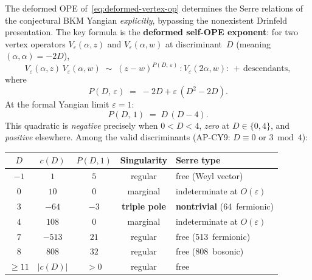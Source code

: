The deformed OPE of~\eqref{eq:deformed-vertex-op} determines the Serre relations
of the conjectural BKM Yangian \emph{explicitly}, bypassing the nonexistent Drinfeld
presentation. The key formula is the \textbf{deformed self-OPE exponent}: for two
vertex operators $V_\varepsilon(\alpha, z)$ and $V_\varepsilon(\alpha, w)$ at
discriminant~$D$ (meaning $(\alpha, \alpha) = -2D$),
\begin{equation}
\label{eq:deformed-self-ope-exponent}
V_\varepsilon(\alpha, z)\, V_\varepsilon(\alpha, w)
\;\sim\; (z - w)^{P(D,\,\varepsilon)}\, {:}V_\varepsilon(2\alpha, w){:}
\,+\, \text{descendants},
\end{equation}
where
\begin{equation}
\label{eq:P-self-formula}
P(D,\,\varepsilon) \;=\; -2D + \varepsilon\,(D^2 - 2D).
\end{equation}
At the formal Yangian limit $\varepsilon = 1$:
\[
P(D,\, 1) \;=\; D\,(D - 4).
\]
This quadratic is \emph{negative} precisely when $0 < D < 4$, \emph{zero} at $D \in \{0, 4\}$,
and \emph{positive} elsewhere. Among the valid discriminants (AP-CY9: $D \equiv 0$ or $3 \bmod 4$):

\begin{center}
\renewcommand{\arraystretch}{1.15}
\begin{tabular}{ccccl}
\toprule
$D$ & $c(D)$ & $P(D, 1)$ & Singularity & Serre type \\
\midrule
$-1$ & $1$ & $5$ & regular & free (Weyl vector) \\
$0$ & $10$ & $0$ & marginal & indeterminate at $O(\varepsilon)$ \\
$3$ & $-64$ & $-3$ & \textbf{triple pole} & \textbf{nontrivial} (64~fermionic) \\
$4$ & $108$ & $0$ & marginal & indeterminate at $O(\varepsilon)$ \\
$7$ & $-513$ & $21$ & regular & free (513~fermionic) \\
$8$ & $808$ & $32$ & regular & free (808~bosonic) \\
$\geq 11$ & $|c(D)|$ & $> 0$ & regular & free \\
\bottomrule
\end{tabular}
\end{center}

